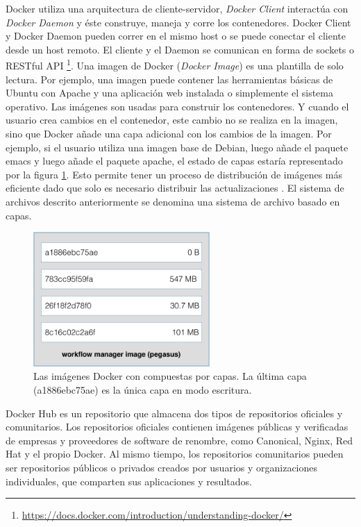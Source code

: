 Docker utiliza una arquitectura de cliente-servidor, \emph{Docker Client} interactúa con \emph{Docker Daemon} y éste construye, maneja y corre los contenedores. Docker Client y Docker Daemon pueden correr en el mismo host o se puede conectar el cliente desde un host remoto. El cliente y el Daemon se comunican en forma de sockets o RESTful API \footnote{\url{https://docs.docker.com/introduction/understanding-docker/}}. 
Una imagen de Docker (\textit{Docker Image}) es una plantilla de solo lectura. Por ejemplo, una imagen puede contener las herramientas básicas de Ubuntu con Apache y una aplicación web instalada o simplemente el sistema operativo. Las imágenes son usadas para construir los contenedores. Y cuando el usuario crea cambios en el contenedor, este cambio no se realiza en la imagen, sino  que Docker añade una capa adicional con los cambios de la imagen\cite{bui2015analysis}. Por ejemplo, si el usuario utiliza una imagen base de Debian, luego añade el paquete emacs y luego añade el paquete apache, el estado de capas estaría representado por la figura \ref{fig:arquitectura}. Esto permite tener un proceso de distribución de imágenes más eficiente dado que solo es necesario distribuir las actualizaciones \cite{bui2015analysis}. El sistema de archivos descrito anteriormente se denomina una sistema de archivo basado en capas.
\begin{figure}[t]
  \centering
  \includegraphics[width=0.6\textwidth]{Figures/docker-filesystems-multilayer}
    \caption[Capas de una imagen de Docker]{Las imágenes Docker con compuestas por capas. 
    La última capa (a1886ebc75ae) es la única capa en modo escritura.}
    \label{fig:arquitectura}
\end{figure}	


Docker Hub es un repositorio que almacena dos tipos de repositorios oficiales y comunitarios. Los repositorios oficiales contienen imágenes públicas y verificadas de empresas y proveedores de software de renombre, como Canonical, Nginx, Red Hat y el propio Docker. Al mismo tiempo, los repositorios comunitarios pueden ser repositorios públicos o privados creados por usuarios y organizaciones individuales, que comparten sus aplicaciones y resultados. 

